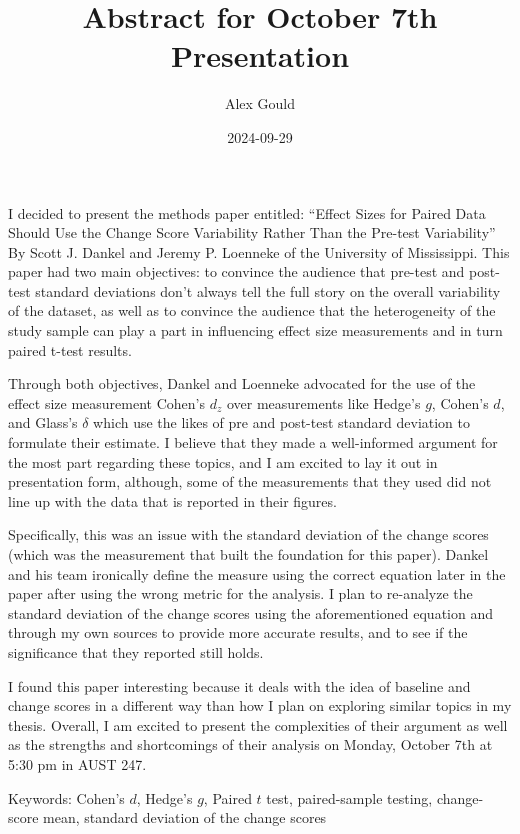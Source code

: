 \documentclass[
]{article}
\title{Abstract for October 7th Presentation}
\author{Alex Gould}
\date{2024-09-29}
\begin{document}
\maketitle

\doublespacing

I decided to present the methods paper entitled: ``Effect Sizes for
Paired Data Should Use the Change Score Variability Rather Than the
Pre-test Variability'' By Scott J. Dankel and Jeremy P. Loenneke of the
University of Mississippi. This paper had two main objectives: to
convince the audience that pre-test and post-test standard deviations
don't always tell the full story on the overall variability of the
dataset, as well as to convince the audience that the heterogeneity of
the study sample can play a part in influencing effect size measurements
and in turn paired t-test results.

Through both objectives, Dankel and Loenneke advocated for the use of
the effect size measurement Cohen's \(d_z\) over measurements like
Hedge's \(g\), Cohen's \(d\), and Glass's \(\delta\) which use the likes
of pre and post-test standard deviation to formulate their estimate. I
believe that they made a well-informed argument for the most part
regarding these topics, and I am excited to lay it out in presentation
form, although, some of the measurements that they used did not line up
with the data that is reported in their figures.

Specifically, this was an issue with the standard deviation of the
change scores (which was the measurement that built the foundation for
this paper). Dankel and his team ironically define the measure using the
correct equation later in the paper after using the wrong metric for the
analysis. I plan to re-analyze the standard deviation of the change
scores using the aforementioned equation and through my own sources to
provide more accurate results, and to see if the significance that they
reported still holds.

I found this paper interesting because it deals with the idea of
baseline and change scores in a different way than how I plan on
exploring similar topics in my thesis. Overall, I am excited to present
the complexities of their argument as well as the strengths and
shortcomings of their analysis on Monday, October 7th at 5:30 pm in AUST
247.

Keywords: Cohen's \(d\), Hedge's \(g\), Paired \(t\) test, paired-sample
testing, change-score mean, standard deviation of the change scores
\end{document}
